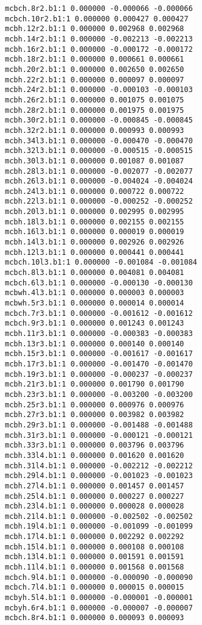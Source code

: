 \begin{verbatim}
mcbch.8r2.b1:1 0.000000 -0.000066 -0.000066
mcbch.10r2.b1:1 0.000000 0.000427 0.000427
mcbh.12r2.b1:1 0.000000 0.002968 0.002968
mcbh.14r2.b1:1 0.000000 -0.002213 -0.002213
mcbh.16r2.b1:1 0.000000 -0.000172 -0.000172
mcbh.18r2.b1:1 0.000000 0.000661 0.000661
mcbh.20r2.b1:1 0.000000 0.002650 0.002650
mcbh.22r2.b1:1 0.000000 0.000097 0.000097
mcbh.24r2.b1:1 0.000000 -0.000103 -0.000103
mcbh.26r2.b1:1 0.000000 0.001075 0.001075
mcbh.28r2.b1:1 0.000000 0.001975 0.001975
mcbh.30r2.b1:1 0.000000 -0.000845 -0.000845
mcbh.32r2.b1:1 0.000000 0.000993 0.000993
mcbh.34l3.b1:1 0.000000 -0.000470 -0.000470
mcbh.32l3.b1:1 0.000000 -0.000515 -0.000515
mcbh.30l3.b1:1 0.000000 0.001087 0.001087
mcbh.28l3.b1:1 0.000000 -0.002077 -0.002077
mcbh.26l3.b1:1 0.000000 -0.004024 -0.004024
mcbh.24l3.b1:1 0.000000 0.000722 0.000722
mcbh.22l3.b1:1 0.000000 -0.000252 -0.000252
mcbh.20l3.b1:1 0.000000 0.002995 0.002995
mcbh.18l3.b1:1 0.000000 0.002155 0.002155
mcbh.16l3.b1:1 0.000000 0.000019 0.000019
mcbh.14l3.b1:1 0.000000 0.002926 0.002926
mcbh.12l3.b1:1 0.000000 0.000441 0.000441
mcbch.10l3.b1:1 0.000000 -0.001084 -0.001084
mcbch.8l3.b1:1 0.000000 0.004081 0.004081
mcbch.6l3.b1:1 0.000000 -0.000130 -0.000130
mcbwh.4l3.b1:1 0.000000 0.000003 0.000003
mcbwh.5r3.b1:1 0.000000 0.000014 0.000014
mcbch.7r3.b1:1 0.000000 -0.001612 -0.001612
mcbch.9r3.b1:1 0.000000 0.001243 0.001243
mcbh.11r3.b1:1 0.000000 -0.000383 -0.000383
mcbh.13r3.b1:1 0.000000 0.000140 0.000140
mcbh.15r3.b1:1 0.000000 -0.001617 -0.001617
mcbh.17r3.b1:1 0.000000 -0.001470 -0.001470
mcbh.19r3.b1:1 0.000000 -0.000237 -0.000237
mcbh.21r3.b1:1 0.000000 0.001790 0.001790
mcbh.23r3.b1:1 0.000000 -0.003200 -0.003200
mcbh.25r3.b1:1 0.000000 0.000976 0.000976
mcbh.27r3.b1:1 0.000000 0.003982 0.003982
mcbh.29r3.b1:1 0.000000 -0.001488 -0.001488
mcbh.31r3.b1:1 0.000000 -0.000121 -0.000121
mcbh.33r3.b1:1 0.000000 0.003796 0.003796
mcbh.33l4.b1:1 0.000000 0.001620 0.001620
mcbh.31l4.b1:1 0.000000 -0.002212 -0.002212
mcbh.29l4.b1:1 0.000000 -0.001023 -0.001023
mcbh.27l4.b1:1 0.000000 0.001457 0.001457
mcbh.25l4.b1:1 0.000000 0.000227 0.000227
mcbh.23l4.b1:1 0.000000 0.000028 0.000028
mcbh.21l4.b1:1 0.000000 -0.002502 -0.002502
mcbh.19l4.b1:1 0.000000 -0.001099 -0.001099
mcbh.17l4.b1:1 0.000000 0.002292 0.002292
mcbh.15l4.b1:1 0.000000 0.000108 0.000108
mcbh.13l4.b1:1 0.000000 0.001591 0.001591
mcbh.11l4.b1:1 0.000000 0.001568 0.001568
mcbch.9l4.b1:1 0.000000 -0.000090 -0.000090
mcbch.7l4.b1:1 0.000000 0.000015 0.000015
mcbyh.5l4.b1:1 0.000000 -0.000001 -0.000001
mcbyh.6r4.b1:1 0.000000 -0.000007 -0.000007
mcbch.8r4.b1:1 0.000000 0.000093 0.000093

\end{verbatim}
